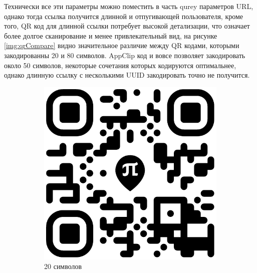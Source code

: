     Технически все эти параметры можно поместить в часть qurey параметров URL, однако тогда ссылка получится длинной и отпугивающей пользователя, кроме того, QR код для длинной ссылки потребует высокой детализации, что означает более долгое сканирование и менее привлекательный вид, на рисунке \ref{img:qrCompare} видно значительное различие между QR кодами, которыми закодированны 20 и 80 символов. AppClip код и вовсе позволяет закодировать около 50 символов, некоторые сочетания которых кодируются оптимальнее, однако длинную ссылку с несколькими UUID закодировать точно не получится.
    \begin{figure}[H]
      \centering
      \begin{subfigure}[b]{0.3\textwidth}
        \centering
        \includegraphics[width=\textwidth]{assets/img/qr/20.pdf}
        \caption{20 символов}
      \end{subfigure}
      \hspace{3cm}
      \begin{subfigure}[b]{.3\textwidth}
        \centering

\end{subfigure}
\end{figure}
